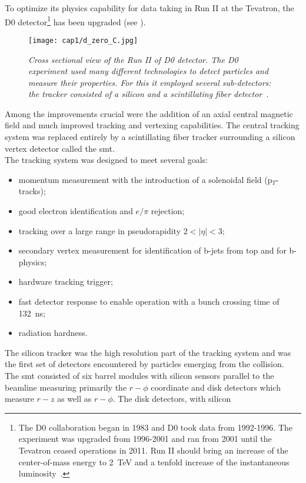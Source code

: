 \hskip 1cm To optimize its physics capability for data taking in Run II at the
Tevatron, the D0 detector\footnote{The D0 collaboration began in 1983 and D0
  took data from 1992-1996. The experiment was upgraded from 1996-2001 and ran
  from 2001 until the Tevatron ceased operations in 2011. Run II should bring an
  increase of the center-of-mass energy to 2~TeV and a tenfold increase of the
  instantaneous luminosity~\cite{Filthaut}.} has been upgraded (see
).
\begin{figure}[!htbp]
  \centering
  \texttt{[image: cap1/d\_zero\_C.jpg]}
  \caption{\textit{Cross sectional view of the Run II of D0 detector. The D0
      experiment used many different technologies to detect particles and
      measure their properties. For this it employed several sub-detectors: the
      tracker consisted of a silicon and a scintillating fiber
      detector~\cite{D0_c}.}}\label{d_zero_c}
\end{figure}
Among the improvements crucial were the addition of an axial central magnetic
field and much improved tracking and vertexing capabilities. The central
tracking system was replaced entirely by a scintillating fiber tracker
surrounding a
silicon vertex detector called the \gls{smt}.\\
The tracking system was designed to meet several goals:
\begin{itemize}
\item momentum measurement with the introduction of a solenoidal field
  (p$_{T}$-tracks);
\item good electron identification and $e/\pi$ rejection;
\item tracking over a large range in pseudorapidity $2 < |\eta| < 3$;
\item secondary vertex measurement for identification of b-jets from top and for
  b-physics;
\item hardware tracking trigger;
\item fast detector response to enable operation with a bunch crossing time of
  132~ns;
\item radiation hardness.
\end{itemize}
The silicon tracker was the high resolution part of the tracking system and was
the first set of detectors encountered by particles emerging
from the collision.\\
The \gls{smt} consisted of six barrel modules with silicon sensors parallel to
the beamline measuring primarily the $r-\phi$ coordinate and disk detectors
which measure $r-z$ as well as $r-\phi$. The disk detectors, with silicon
